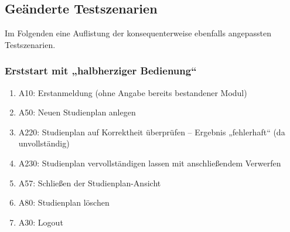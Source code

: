 \newenvironment{scenario}[1]{
	\vspace{-\baselineskip}
	\subsubsection*{#1} 
	\vspace{-\baselineskip}
	\begin{enumerate}[nosep]
}{
	\end{enumerate}
}

\newenvironment{scenario*}[2]{
	\vspace{-\baselineskip}
	\subsubsection*{#1} \vspace{-\baselineskip}
	\hspace{0pt}#2  \vspace{-\baselineskip}
	\begin{enumerate}[nosep]
}{
	\end{enumerate}
}


\FloatBarrier
\subsection{Geänderte Testszenarien}

Im Folgenden eine Auflistung der konsequenterweise ebenfalls angepassten Testszenarien.

\begin{scenario}{Erststart mit „halbherziger Bedienung“}
	\item A10: Erstanmeldung (ohne Angabe bereits bestandener {Modul})
	\item A50: Neuen Studienplan anlegen
	\item A220: Studienplan auf Korrektheit überprüfen – Ergebnis „fehlerhaft“ (da unvollständig)
	\item A230: Studienplan vervollständigen lassen mit anschließendem Verwerfen
	\item A57: Schließen der Studienplan-Ansicht
	\item A80: Studienplan löschen 
	\item A30: Logout
\end{scenario}

